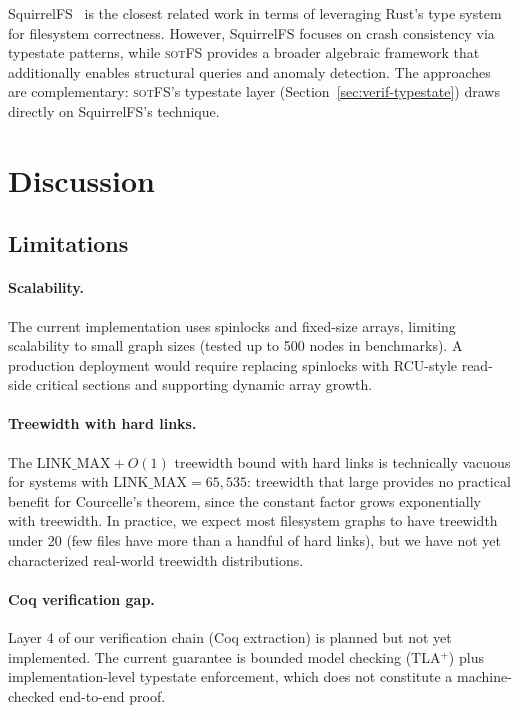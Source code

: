 \documentclass[11pt,a4paper]{article}
\theoremstyle{definition}
\theoremstyle{remark}
\newcommand{\sotfs}{\textsc{sotFS}}
\begin{document}
SquirrelFS~\cite{kadekodi2024} is the closest related work in
terms of leveraging Rust's type system for filesystem correctness.
However, SquirrelFS focuses on crash consistency via typestate
patterns, while \sotfs{} provides a broader algebraic framework
that additionally enables structural queries and anomaly detection.
The approaches are complementary: \sotfs{}'s typestate layer
(Section~\ref{sec:verif-typestate}) draws directly on SquirrelFS's
technique.

\section{Discussion}
\label{sec:discussion}

\subsection{Limitations}
\label{sec:discussion-limits}

\paragraph{Scalability.}
The current implementation uses spinlocks and fixed-size arrays,
limiting scalability to small graph sizes (tested up to 500 nodes
in benchmarks). A production deployment would require replacing
spinlocks with RCU-style read-side critical sections and supporting
dynamic array growth.

\paragraph{Treewidth with hard links.}
The $\mathrm{LINK\_MAX} + O(1)$ treewidth bound with hard links is
technically vacuous for systems with $\mathrm{LINK\_MAX} = 65{,}535$:
treewidth that large provides no practical benefit for Courcelle's
theorem, since the constant factor grows exponentially with treewidth.
In practice, we expect most filesystem graphs to have treewidth under
20 (few files have more than a handful of hard links), but we have not
yet characterized real-world treewidth distributions.

\paragraph{Coq verification gap.}
Layer 4 of our verification chain (Coq extraction) is planned but not
yet implemented. The current guarantee is bounded model checking
(TLA$^+$) plus implementation-level typestate enforcement, which does
not constitute a machine-checked end-to-end proof.
\end{document}
